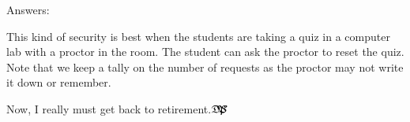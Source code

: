 \documentclass[10pt]{article}
\def\dps{$\mbox{$\mathfrak D$\kern-.3em\mbox{$\mathfrak P$}%
   \kern-.6em \hbox{$\mathcal S$}}$}
\def\dps{$\mbox{$\mathfrak D$\kern-.3em\mbox{$\mathfrak P$}%
   \kern-.6em \hbox{$\mathcal S$}}$}
\def\dps{$\hbox{$\mathfrak D$\kern-.3em\hbox{$\mathfrak P$}%
   \kern-.6em \hbox{$\mathcal S$}}$}
\begin{document}
\noindent
Answers: \AnswerField\currQuiz\vcgBdry[6pt]

This kind of security is best when the students are taking a quiz in a
computer lab with a proctor in the room. The student can ask the proctor to
reset the quiz. Note that we keep a tally on the number of requests as the
proctor may not write it down or remember.

\medbreak\noindent
Now, I really must get back to retirement.\enspace\dps
\end{document}
